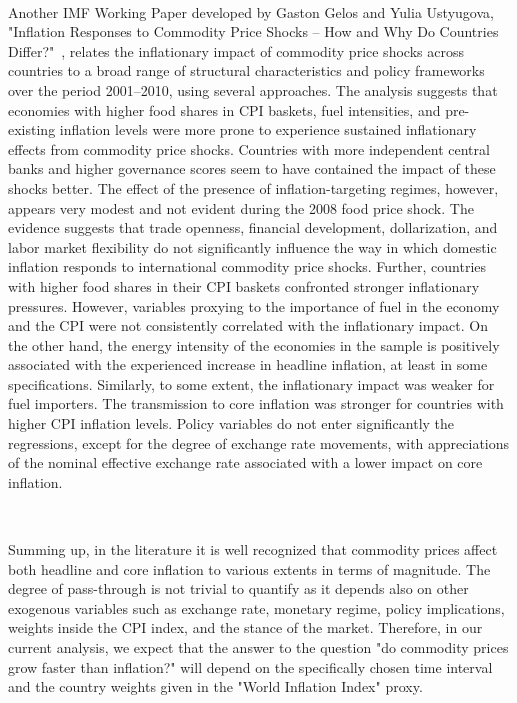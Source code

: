 \documentclass{article}
\begin{document}
\

Another IMF Working Paper developed by Gaston Gelos and Yulia Ustyugova, "Inflation Responses to Commodity Price Shocks – How and Why Do Countries Differ?"~\cite{gelos2012inflation}, relates the inflationary impact of commodity price shocks across countries to a broad range of structural characteristics and policy frameworks over the period 2001–2010, using several approaches. The analysis suggests that economies with higher food shares in CPI baskets, fuel intensities, and pre-existing inflation levels were more prone to experience sustained inflationary effects from commodity price shocks. Countries with more independent central banks and higher governance scores seem to have contained the impact of these shocks better. The effect of the presence of inflation-targeting regimes, however, appears very modest and not evident during the 2008 food price shock. The evidence suggests that trade openness, financial development, dollarization, and labor market flexibility do not significantly influence the way in which domestic inflation responds to international commodity price shocks. Further, countries with higher food shares in their CPI baskets confronted stronger inflationary pressures. However, variables proxying to the importance of fuel in the economy and the CPI were not consistently correlated with the inflationary impact. On the other hand, the energy intensity of the economies in the sample is positively associated with the experienced increase in headline inflation, at least in some specifications. Similarly, to some extent, the inflationary impact was weaker for fuel importers. The transmission to core inflation was stronger for countries with higher CPI inflation levels. Policy variables do not enter significantly the regressions, except for the degree of exchange rate movements, with appreciations of the nominal effective exchange rate associated with a lower impact on core inflation. 

\

Summing up, in the literature it is well recognized that commodity prices affect both headline and core inflation to various extents in terms of magnitude. The degree of pass-through is not trivial to quantify as it depends also on other exogenous variables such as exchange rate, monetary regime, policy implications, weights inside the CPI index, and the stance of the market. Therefore, in our current analysis, we expect that the answer to the question "do commodity prices grow faster than inflation?" will depend on the specifically chosen time interval and the country weights given in the "World Inflation Index" proxy. 
\end{document}
